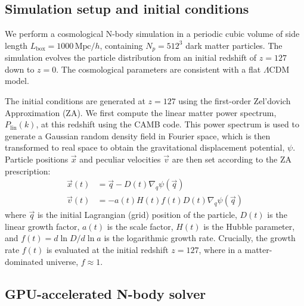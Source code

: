 \documentclass[]{article}
\begin{document}
\subsection{Simulation setup and initial conditions}

We perform a cosmological N-body simulation in a periodic cubic volume of side length $L_{\text{box}} = 1000 \, \text{Mpc}/h$, containing $N_p = 512^3$ dark matter particles. The simulation evolves the particle distribution from an initial redshift of $z=127$ down to $z=0$. The cosmological parameters are consistent with a flat $\Lambda$CDM model.

The initial conditions are generated at $z=127$ using the first-order Zel'dovich Approximation (ZA). We first compute the linear matter power spectrum, $P_{\text{lin}}(k)$, at this redshift using the CAMB code. This power spectrum is used to generate a Gaussian random density field in Fourier space, which is then transformed to real space to obtain the gravitational displacement potential, $\psi$. Particle positions $\vec{x}$ and peculiar velocities $\vec{v}$ are then set according to the ZA prescription:
\begin{align}
\vec{x}(t) &= \vec{q} - D(t) \nabla_q \psi(\vec{q}) \\
\vec{v}(t) &= -a(t) H(t) f(t) D(t) \nabla_q \psi(\vec{q})
\end{align}
where $\vec{q}$ is the initial Lagrangian (grid) position of the particle, $D(t)$ is the linear growth factor, $a(t)$ is the scale factor, $H(t)$ is the Hubble parameter, and $f(t) = d \ln D / d \ln a$ is the logarithmic growth rate. Crucially, the growth rate $f(t)$ is evaluated at the initial redshift $z=127$, where in a matter-dominated universe, $f \approx 1$.

\subsection{GPU-accelerated N-body solver}
\end{document}
